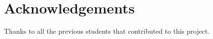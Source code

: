 \chapter{Acknowledgements}
Thanks to all the previous students that contributed to this project.

\lipsum*[1-2]